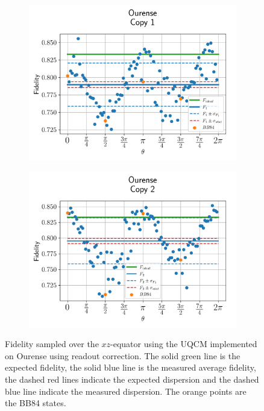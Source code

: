 \begin{figure}[H]
    \centering
    \begin{subfigure}{.45\textwidth}
      \centering
      \includegraphics[width=\textwidth]{Figures/UQCM/IBM/OnlyEquator/results_corrected_ourense_copy1.png}
    \end{subfigure}%
    \begin{subfigure}{.45\textwidth}
      \centering
      \includegraphics[width=\textwidth]{Figures/UQCM/IBM/OnlyEquator/results_corrected_ourense_copy2.png}
    \end{subfigure}
    \caption{Fidelity sampled over the $xz$-equator using the UQCM implemented on Ourense using readout correction. The solid green line is the expected fidelity, the solid blue line is the measured average fidelity, the dashed red lines indicate the expected dispersion and the dashed blue line indicate the measured dispersion. The orange points are the BB84 states.}
    \label{fig:uqcm_eq_our}
\end{figure}

